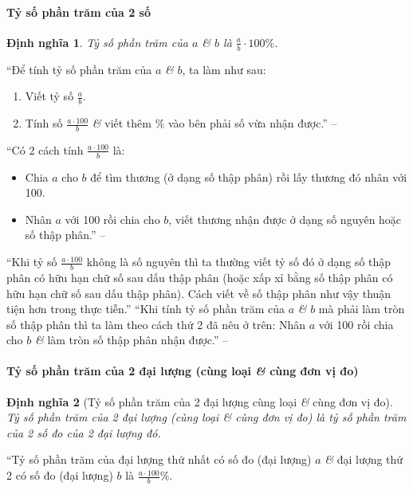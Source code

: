 \documentclass{article}
\numberwithin{equation}{section}
\newtheorem{dinhnghia}{Định nghĩa}[section]
\begin{document}
\paragraph{Tỷ số phần trăm của 2 số}
\begin{dinhnghia}
	\emph{Tỷ số phần trăm} của $a$ \textit{\&} $b$ là $\frac{a}{b}\cdot 100\%$.
\end{dinhnghia}
``Để tính tỷ số phần trăm của $a$ \textit{\&} $b$, ta làm như sau:
\begin{enumerate}
	\item Viết tỷ số $\frac{a}{b}$.
	\item Tính số $\frac{a\cdot100}{b}$ \textit{\&} viết thêm $\%$ vào bên phải số vừa nhận được.'' -- \cite[p. 63]{SGK_Toan_6_Canh_Dieu_tap_2}
\end{enumerate}
``Có 2 cách tính $\frac{a\cdot 100}{b}$ là:
\begin{itemize}
	\item Chia $a$ cho $b$ để tìm thương (ở dạng số thập phân) rồi lấy thương đó nhân với 100.
	\item Nhân $a$ với 100 rồi chia cho $b$, viết thương nhận được ở dạng số nguyên hoặc số thập phân.'' -- \cite[p. 63]{SGK_Toan_6_Canh_Dieu_tap_2}
\end{itemize}
``Khi tỷ số $\frac{a\cdot 100}{b}$ không là số nguyên thì ta thường viết tỷ số đó ở dạng số thập phân có hữu hạn chữ số sau dấu thập phân (hoặc xấp xỉ bằng số thập phân có hữu hạn chữ số sau dấu thập phân). Cách viết về số thập phân như vậy thuận tiện hơn trong thực tiễn.'' ``Khi tính tỷ số phần trăm của $a$ \textit{\&} $b$ mà phải làm tròn số thập phân thì ta làm theo cách thứ 2 đã nêu ở trên: Nhân $a$ với 100 rồi chia cho $b$ \textit{\&} làm tròn số thập phân nhận được.'' -- \cite[p. 64]{SGK_Toan_6_Canh_Dieu_tap_2}

\paragraph{Tỷ số phần trăm của 2 đại lượng (cùng loại \textit{\&} cùng đơn vị đo)}
\begin{dinhnghia}[Tỷ số phần trăm của 2 đại lượng cùng loại \textit{\&} cùng đơn vị đo]
	 \emph{Tỷ số phần trăm của 2 đại lượng (cùng loại \textit{\&} cùng đơn vị đo)} là tỷ số phần trăm của 2 số đo của 2 đại lượng đó.
\end{dinhnghia}
``Tỷ số phần trăm của đại lượng thứ nhất có số đo (đại lượng) $a$ \textit{\&} đại lượng thứ 2 có số đo (đại lượng) $b$ là $\frac{a\cdot100}{b}\%$.
\end{document}

